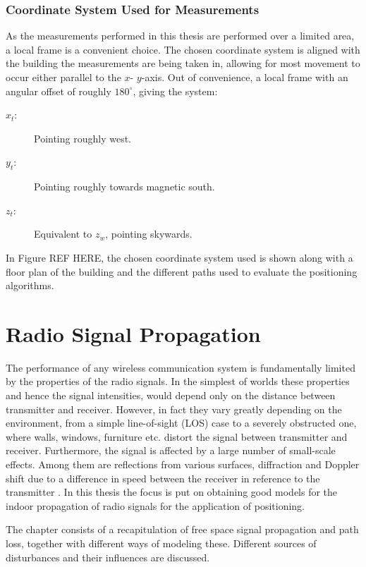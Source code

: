 \documentclass{LTHthesis}
\begin{document}
%
\subsection{Coordinate System Used for Measurements}
%
%
As the measurements performed in this thesis are performed over a limited area, a local frame is a convenient choice. The chosen coordinate system is aligned with the building the measurements are being taken in, allowing for most movement to occur either parallel to the $x$- $y$-axis. Out of convenience, a local frame with an angular offset of roughly $180^\circ$, giving the system:
%
\begin{description}
\item[$x_t$:] Pointing roughly west. 
\item[$y_t$:] Pointing roughly towards magnetic south.
\item[$z_t$:] Equivalent to $z_w$, pointing skywards.
\end{description}
%
In Figure REF HERE, the chosen coordinate system used is shown along with a floor plan of the building and the different paths used to evaluate the positioning algorithms.
%
\chapter{Radio Signal Propagation}
%
\label{chap:RSP}
%
The performance of any wireless communication system is fundamentally limited by the properties of the radio signals. In the simplest of worlds these properties and hence the signal intensities, would depend only on the distance between transmitter and receiver. However, in fact they vary greatly depending on the environment, from a simple line-of-sight (LOS) case to a severely obstructed one, where walls, windows, furniture etc. distort the signal between transmitter and receiver. Furthermore, the signal is affected by a large number of small-scale effects. Among them are reflections from various surfaces, diffraction and Doppler shift due to a difference in speed between the receiver in reference to the transmitter \cite{rappaport96}. In this thesis the focus is put on obtaining good models for the indoor propagation of radio signals for the application of positioning. 

The chapter consists of a recapitulation of free space signal propagation and path loss, together with different ways of modeling these. Different sources of disturbances and their influences are discussed. 
%
\end{document}
